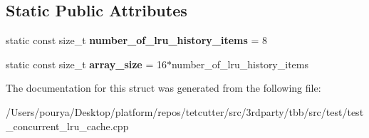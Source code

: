 \subsection*{Static Public Attributes}
\begin{DoxyCompactItemize}
\item 
\hypertarget{structconcurrency__tests_1_1filled__instance__counting__fixture__with__external__array_af8f6f8c3d0d3e98d4c47e553533da781}{}static const size\+\_\+t {\bfseries number\+\_\+of\+\_\+lru\+\_\+history\+\_\+items} = 8\label{structconcurrency__tests_1_1filled__instance__counting__fixture__with__external__array_af8f6f8c3d0d3e98d4c47e553533da781}

\item 
\hypertarget{structconcurrency__tests_1_1filled__instance__counting__fixture__with__external__array_af97010e0e1ba9b5d37ea69b5681b98e9}{}static const size\+\_\+t {\bfseries array\+\_\+size} = 16$\ast$number\+\_\+of\+\_\+lru\+\_\+history\+\_\+items\label{structconcurrency__tests_1_1filled__instance__counting__fixture__with__external__array_af97010e0e1ba9b5d37ea69b5681b98e9}

\end{DoxyCompactItemize}


The documentation for this struct was generated from the following file\+:\begin{DoxyCompactItemize}
\item 
/\+Users/pourya/\+Desktop/platform/repos/tetcutter/src/3rdparty/tbb/src/test/test\+\_\+concurrent\+\_\+lru\+\_\+cache.\+cpp\end{DoxyCompactItemize}
